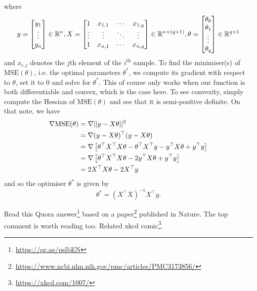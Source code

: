 \documentclass[11pt]{article}
\begin{document}
where
$$
y
=
\begin{bmatrix}
    y_1\\
    \vdots\\
    y_n
\end{bmatrix}
\in\mathbb{R}^n,
X
=
\begin{bmatrix}
    1 & x_{1,1} & \cdots & x_{1,q}\\
    \vdots & \vdots & \ddots & \vdots\\
    1 & x_{n,1} & \cdots & x_{n,q}
\end{bmatrix}
\in\mathbb{R}^{n\times (q+1)},
\theta
=
\begin{bmatrix}
    \theta_0\\
    \theta_1\\
    \vdots\\
    \theta_q
\end{bmatrix}
\in\mathbb{R}^{q+1}
$$
and $x_{i,j}$ denotes the $j$th element of the $i^{\text{th}}$ sample. To find the minimiser(s) of $\text{MSE}(\theta)$, i.e. the optimal parameters $\theta^{*}$, we compute its gradient with respect to $\theta$, set it to $0$ and solve for $\theta^{*}$. This of course only works when our function is both differentiable and convex, which is the case here. To see convexity, simply compute the Hessian of $\text{MSE}(\theta)$ and see that it is semi-positive definite. On that note, we have
\begin{align*}
    \nabla\text{MSE}(\theta)
    &=
    \nabla||y-X\theta||^2\\
    &=
    \nabla(y-X\theta)^{\top}(y-X\theta)\\
    &=
    \nabla\left[\theta^{\top}X^{\top}X\theta-\theta^{\top}X^{\top}y-y^{\top}X\theta+y^{\top}y\right]\\
    &=
    \nabla\left[\theta^{\top}X^{\top}X\theta-2y^{\top}X\theta+y^{\top}y\right]\\
    &=
    2X^{\top}X\theta-2X^{\top}y
\end{align*}
and so the optimiser $\theta^{*}$ is given by
$$
\theta^{*}=(X^{\top}X)^{-1}X^{\top}y.
$$

\begin{tcolorbox}[title={\textbf{Funny misuse of linear regression: Momentous sprint at the 2156 Olympics?}}, colback=myLightBlue, colbacktitle=myDarkBlue, colframe=myDarkBlue, coltitle=white]
    Read this Quora answer\footnote{\url{https://qr.ae/pslbEN}} based on a paper\footnote{\url{https://www.ncbi.nlm.nih.gov/pmc/articles/PMC3173856/}} published in Nature. The top comment is worth reading too. Related xkcd comic\footnote{\url{https://xkcd.com/1007/}}.
\end{tcolorbox}
\end{document}
